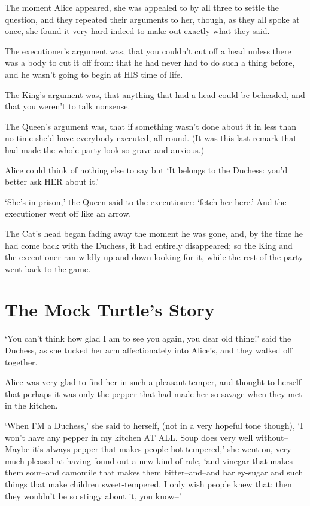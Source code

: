\documentclass[12pt]{book}
\begin{document}
  The moment Alice appeared, she was appealed to by all three to
settle the question, and they repeated their arguments to her,
though, as they all spoke at once, she found it very hard indeed
to make out exactly what they said.

  The executioner's argument was, that you couldn't cut off a
head unless there was a body to cut it off from:  that he had
never had to do such a thing before, and he wasn't going to begin
at HIS time of life.

  The King's argument was, that anything that had a head could be
beheaded, and that you weren't to talk nonsense.

  The Queen's argument was, that if something wasn't done about
it in less than no time she'd have everybody executed, all round.
(It was this last remark that had made the whole party look so
grave and anxious.)

  Alice could think of nothing else to say but `It belongs to the
Duchess:  you'd better ask HER about it.'

  `She's in prison,' the Queen said to the executioner:  `fetch
her here.'  And the executioner went off like an arrow.

   The Cat's head began fading away the moment he was gone, and,
by the time he had come back with the Duchess, it had entirely
disappeared; so the King and the executioner ran wildly up and down
looking for it, while the rest of the party went back to the game.

\chapter{The Mock Turtle's Story}

  `You can't think how glad I am to see you again, you dear old
thing!' said the Duchess, as she tucked her arm affectionately
into Alice's, and they walked off together.

  Alice was very glad to find her in such a pleasant temper, and
thought to herself that perhaps it was only the pepper that had
made her so savage when they met in the kitchen.

  `When I'M a Duchess,' she said to herself, (not in a very
hopeful tone though), `I won't have any pepper in my kitchen AT
ALL.  Soup does very well without--Maybe it's always pepper that
makes people hot-tempered,' she went on, very much pleased at
having found out a new kind of rule, `and vinegar that makes them
sour--and camomile that makes them bitter--and--and barley-sugar
and such things that make children sweet-tempered.  I only wish
people knew that:  then they wouldn't be so stingy about it, you
know--'
\end{document}
